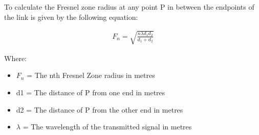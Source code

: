 
To calculate the Fresnel zone radius at any point P in between the endpoints of the link is given by the following equation: 

\begin{align*}
F_n = \sqrt{\frac{n \lambda d_1 d_2}{d_1+d_2}}
\end{align*}

Where:
\begin{itemize}[label=]
\item $F_n$ = The nth Fresnel Zone radius in metres
\item d1 = The distance of P from one end in metres
\item d2 = The distance of P from the other end in metres
\item $\lambda$ = The wavelength of the transmitted signal in metres
\end{itemize}

